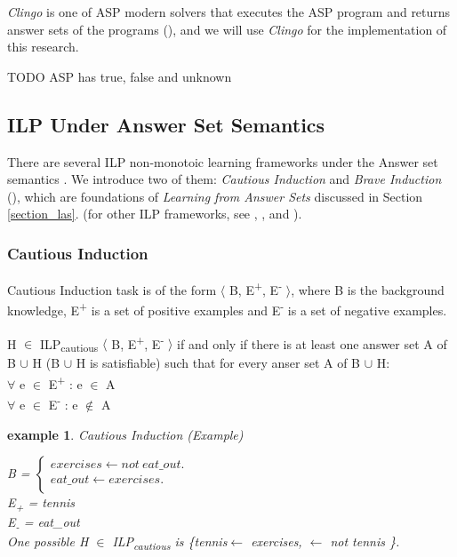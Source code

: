 \documentclass[12pt,twoside]{report}
\newtheorem{examp}{example}[section]
\begin{document}
\textit{Clingo} is one of ASP modern solvers that executes the ASP program and returns answer sets of the programs (\cite{Gebser2011}), and we will use \textit{Clingo} for the implementation of this research.

TODO ASP has true, false and unknown

\subsection{ILP Under Answer Set Semantics}

There are several ILP non-monotoic learning frameworks under the Answer set semantics . We introduce two of them: \textit{Cautious Induction} and \textit{Brave Induction} (\cite{Sakama2009}), which are foundations of \textit{Learning from Answer Sets} discussed in Section \ref{section_las}.  (for other ILP frameworks, see \cite{Otero2001}, \cite{Inoue2014}, \cite{Corapi2012} and \cite{DeRaedt1997}).
\subsubsection{Cautious Induction}
Cautious Induction task is of the form $\langle$ B, E\textsuperscript{+}, E\textsuperscript{-} $\rangle$, where B is the background knowledge, E\textsuperscript{+} is a set of positive examples and E\textsuperscript{-} is a set of negative examples.

 H $\in$ ILP\textsubscript{cautious} $\langle$ B, E\textsuperscript{+}, E\textsuperscript{-} $\rangle$ if and only if  there is at least one answer set A of B $\cup$ H (B $\cup$ H is satisfiable) such that for every anser set A of B $\cup$ H: \\
$\forall$ e $\in$ E\textsuperscript{+} : e $\in$ A \\
$\forall$ e $\in$ E\textsuperscript{-} : e $\notin$ A \\

\begin{examp} \normalfont Cautious Induction (Example)

B = $\begin{cases}
	exercises  \leftarrow not \ eat\_out. \\
	eat\_out \leftarrow exercises. \\
      \end{cases}$ \\
E\textsubscript{+} = tennis \\
E\textsubscript{-} = eat\_out \\
One possible  H $\in$ ILP\textsubscript{cautious} is \{tennis$ \leftarrow$ exercises, $\leftarrow$ not tennis \}.
\end{examp}
\label{cautious_induction_example}
\end{document}
